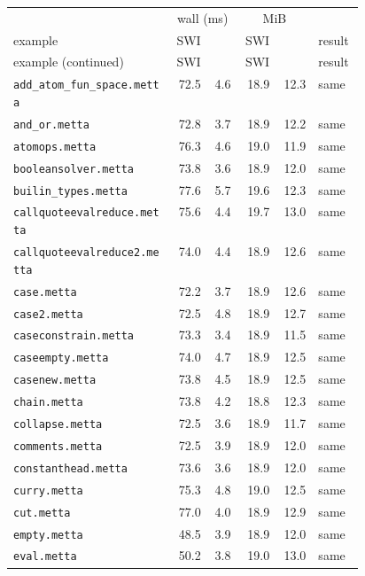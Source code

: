 \begingroup
\footnotesize
\setlength{\tabcolsep}{4pt}
\begin{longtable}{@{}p{0.46\linewidth}rrrrl@{}}
\toprule
 & \multicolumn{2}{c}{wall (ms)} & \multicolumn{2}{c}{MiB} & \\
example & SWI & \CeTTa{} & SWI & \CeTTa{} & result \\
\midrule
\endfirsthead
\toprule
example (continued) & SWI & \CeTTa{} & SWI & \CeTTa{} & result \\
\midrule
\endhead
\bottomrule
\endfoot
\nolinkurl{add_atom_fun_space.metta} & 72.5 & 4.6 & 18.9 & 12.3 & same \\
\nolinkurl{and_or.metta} & 72.8 & 3.7 & 18.9 & 12.2 & same \\
\nolinkurl{atomops.metta} & 76.3 & 4.6 & 19.0 & 11.9 & same \\
\nolinkurl{booleansolver.metta} & 73.8 & 3.6 & 18.9 & 12.0 & same \\
\nolinkurl{builin_types.metta} & 77.6 & 5.7 & 19.6 & 12.3 & same \\
\nolinkurl{callquoteevalreduce.metta} & 75.6 & 4.4 & 19.7 & 13.0 & same \\
\nolinkurl{callquoteevalreduce2.metta} & 74.0 & 4.4 & 18.9 & 12.6 & same \\
\nolinkurl{case.metta} & 72.2 & 3.7 & 18.9 & 12.6 & same \\
\nolinkurl{case2.metta} & 72.5 & 4.8 & 18.9 & 12.7 & same \\
\nolinkurl{caseconstrain.metta} & 73.3 & 3.4 & 18.9 & 11.5 & same \\
\nolinkurl{caseempty.metta} & 74.0 & 4.7 & 18.9 & 12.5 & same \\
\nolinkurl{casenew.metta} & 73.8 & 4.5 & 18.9 & 12.5 & same \\
\nolinkurl{chain.metta} & 73.8 & 4.2 & 18.8 & 12.3 & same \\
\nolinkurl{collapse.metta} & 72.5 & 3.6 & 18.9 & 11.7 & same \\
\nolinkurl{comments.metta} & 72.5 & 3.9 & 18.9 & 12.0 & same \\
\nolinkurl{constanthead.metta} & 73.6 & 3.6 & 18.9 & 12.0 & same \\
\nolinkurl{curry.metta} & 75.3 & 4.8 & 19.0 & 12.5 & same \\
\nolinkurl{cut.metta} & 77.0 & 4.0 & 18.9 & 12.9 & same \\
\nolinkurl{empty.metta} & 48.5 & 3.9 & 18.9 & 12.0 & same \\
\nolinkurl{eval.metta} & 50.2 & 3.8 & 19.0 & 13.0 & same \\

\end{longtable}
